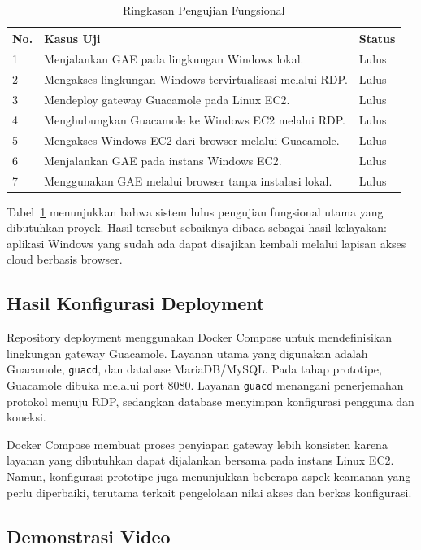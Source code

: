 \documentclass[conference]{IEEEtran}
\begin{document}
\begin{table}[!t]
\centering
\caption{Ringkasan Pengujian Fungsional}
\label{tab:testing}
\begin{tabularx}{\columnwidth}{p{0.45cm}X p{1.15cm}}
\toprule
\textbf{No.} & \textbf{Kasus Uji} & \textbf{Status} \\
\midrule
1 & Menjalankan GAE pada lingkungan Windows lokal. & Lulus \\
2 & Mengakses lingkungan Windows tervirtualisasi melalui RDP. & Lulus \\
3 & Mendeploy gateway Guacamole pada Linux EC2. & Lulus \\
4 & Menghubungkan Guacamole ke Windows EC2 melalui RDP. & Lulus \\
5 & Mengakses Windows EC2 dari browser melalui Guacamole. & Lulus \\
6 & Menjalankan GAE pada instans Windows EC2. & Lulus \\
7 & Menggunakan GAE melalui browser tanpa instalasi lokal. & Lulus \\
\bottomrule
\end{tabularx}
\end{table}

Tabel~\ref{tab:testing} menunjukkan bahwa sistem lulus pengujian fungsional utama yang dibutuhkan proyek. Hasil tersebut sebaiknya dibaca sebagai hasil kelayakan: aplikasi Windows yang sudah ada dapat disajikan kembali melalui lapisan akses cloud berbasis browser.

\subsection{Hasil Konfigurasi Deployment}

Repository deployment menggunakan Docker Compose untuk mendefinisikan lingkungan gateway Guacamole. Layanan utama yang digunakan adalah Guacamole, \texttt{guacd}, dan database MariaDB/MySQL. Pada tahap prototipe, Guacamole dibuka melalui port 8080. Layanan \texttt{guacd} menangani penerjemahan protokol menuju RDP, sedangkan database menyimpan konfigurasi pengguna dan koneksi.

Docker Compose membuat proses penyiapan gateway lebih konsisten karena layanan yang dibutuhkan dapat dijalankan bersama pada instans Linux EC2. Namun, konfigurasi prototipe juga menunjukkan beberapa aspek keamanan yang perlu diperbaiki, terutama terkait pengelolaan nilai akses dan berkas konfigurasi.

\subsection{Demonstrasi Video}
\end{document}
